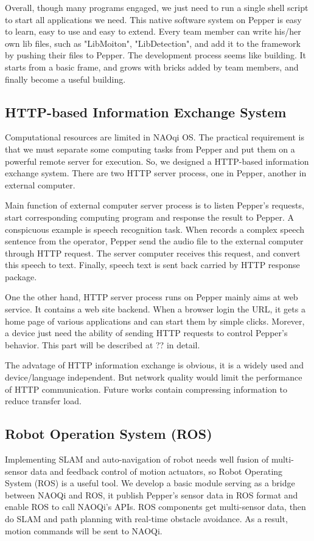 Overall, though many programs engaged, we just need to run a single shell script to start all applications we need. 
This native software system on Pepper is easy to learn, easy to use and easy to extend. 
Every team member can write his/her own lib files, such as "LibMoiton", "LibDetection", and add it to the framework by pushing their files to Pepper. 
The development process seems like building. It starts from a basic frame, and grows with bricks added by team members, and finally become a useful building.

\subsection{HTTP-based Information Exchange System}
\label{subsec:http}
Computational resources are limited in NAOqi OS. 
The practical requirement is that we must separate some computing tasks from Pepper and put them on a powerful remote server for execution. 
So, we designed a HTTP-based information exchange system. There are two HTTP server process, one in Pepper, another in external computer. 

Main function of external computer server process is to listen Pepper’s requests, start corresponding computing program and response the result to Pepper. 
A conspicuous example is speech recognition task. 
When records a complex speech sentence from the operator, Pepper send the audio file to the external computer through HTTP request. 
The server computer receives this request, and convert this speech to text. 
Finally, speech text is sent back carried by HTTP response package. 

One the other hand, HTTP server process runs on Pepper mainly aims at web service. 
It contains a web site backend. 
When a browser login the URL, it gets a home page of various applications and can start them by simple clicks. 
Morever, a device just need the ability of sending HTTP requests to control Pepper’s behavior. 
This part will be described at ?? in detail. 

The advatage of HTTP information exchange is obvious, it is a widely used and device/language independent. 
But network quality would limit the performance of HTTP communication. 
Future works contain compressing information to reduce transfer load.

\subsection{Robot Operation System (ROS)}
\label{subsec:ros}

Implementing SLAM and auto-navigation of robot needs well fusion of multi-sensor data and feedback control of motion actuators, so Robot Operating System (ROS) is a useful tool. 
We develop a basic module serving as a bridge between NAOQi and ROS, it publish Pepper’s sensor data in ROS format and enable ROS to call NAOQi’s APIs. 
ROS components get multi-sensor data, then do SLAM and path planning with real-time obstacle avoidance. 
As a result, motion commands will be sent to NAOQi.